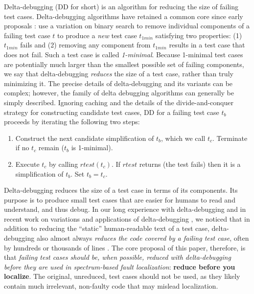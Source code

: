 Delta-debugging \cite{DD} (DD for short) is an algorithm for reducing
the size of failing test cases.  Delta-debugging algorithms have
retained a common core since early proposals \cite{DDISSTA}: use a
variation on binary search to remove individual components of a
failing test case $t$ to produce a \emph{new} test case $t_{1min}$
satisfying two properties: (1) $t_{1min}$ fails and (2) removing any
component from $t_{1min}$ results in a test case that does not fail.
Such a test case is called \emph{1-minimal}.  Because 1-minimal test
cases are potentially much larger than the smallest possible set of
failing components, we say that delta-debugging \emph{reduces} the
size of a test case, rather than truly minimizing it.  The precise
details of delta-debugging and its variants can be complex; however,
the family of delta debugging algorithms can generally be simply
described.  Ignoring caching and the details of the divide-and-conquer
strategy for constructing candidate test cases, DD for a
failing test case $t_b$ proceeds by iterating the following two
steps:

\begin{enumerate}
\item Construct the next candidate simplification of $t_b$, which
we call $t_c$.  Terminate if no $t_c$ remain ($t_b$ is 1-minimal).
\item Execute $t_c$ by calling $\mathit{rtest}(t_c)$.  If $\mathit{rtest}$ returns  (the test fails) then it is a simplification of $t_b$.  Set $t_b = t_c$.
\end{enumerate}

Delta-debugging reduces the size of a test case in terms of its
components.  Its purpose is to produce small test cases that are
easier for humans to read and understand, and thus debug.  In our long
experience with delta-debugging \cite{ICSEDiff,AMAI} and in recent
work on variations and applications of delta-debugging
\cite{icst2014,issta14,PLDI13}, we noticed that in addition to
reducing the ``static'' human-readable text of a test case,
delta-debugging also almost always \emph{reduces the code covered by a
failing test case}, often by hundreds or thousands of lines
\cite{icst2014}.  The core proposal of this paper, therefore, is that
\emph{failing test cases should be, when possible, reduced with
delta-debugging before they are used in spectrum-based fault
localization}: {\bf reduce before you localize}.  The original,
unreduced, test cases should not be used, as they likely contain much
irrelevant, non-faulty code that may mislead localization.

